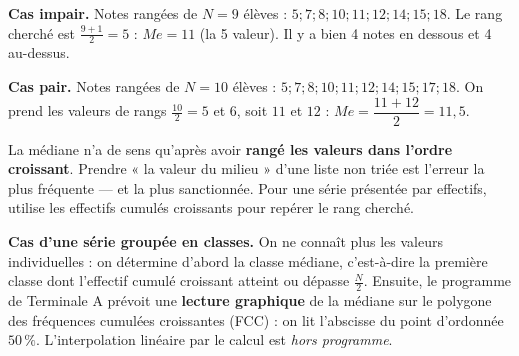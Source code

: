 \documentclass[11pt]{article}
\newcommand{\cle}[1]{{\popxbold\color{popdark}#1}}
\begin{document}
\begin{exemplebox}
\textbf{Cas impair.} Notes rangées de $N = 9$ élèves : $5 ; 7 ; 8 ; 10 ; 11 ; 12 ; 14 ; 15 ; 18$. Le rang cherché est $\frac{9+1}{2} = 5$ : $Me = 11$ (la 5 valeur). Il y a bien 4 notes en dessous et 4 au-dessus.

\textbf{Cas pair.} Notes rangées de $N = 10$ élèves : $5 ; 7 ; 8 ; 10 ; 11 ; 12 ; 14 ; 15 ; 17 ; 18$. On prend les valeurs de rangs $\frac{10}{2} = 5$ et $6$, soit $11$ et $12$ : $Me = \dfrac{11+12}{2} = 11{,}5$.
\end{exemplebox}

\begin{attention}
La médiane n'a de sens qu'après avoir \textbf{rangé les valeurs dans l'ordre croissant}. Prendre « la valeur du milieu » d'une liste non triée est l'erreur la plus fréquente — et la plus sanctionnée. Pour une série présentée par effectifs, utilise les \cle{effectifs cumulés croissants} pour repérer le rang cherché.
\end{attention}

\textbf{Cas d'une série groupée en classes.} On ne connaît plus les valeurs individuelles : on détermine d'abord la \cle{classe médiane}, c'est-à-dire la première classe dont l'effectif cumulé croissant atteint ou dépasse $\frac{N}{2}$. Ensuite, le programme de Terminale A prévoit une \textbf{lecture graphique} de la médiane sur le polygone des fréquences cumulées croissantes (FCC) : on lit l'abscisse du point d'ordonnée $50\,\%$. L'interpolation linéaire par le calcul est \emph{hors programme}.
\end{document}

